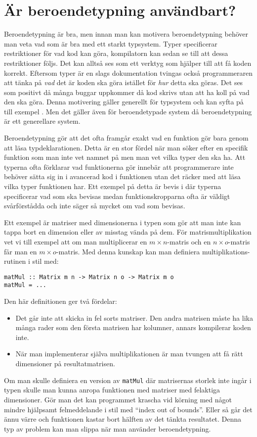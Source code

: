 \section{Är beroendetypning användbart?}
Beroendetypning är bra, men innan man kan motivera beroendetypning behöver man
veta vad som är bra med ett starkt typsystem.
Typer specificerar restriktioner för vad kod kan göra, kompilatorn kan sedan se
till att dessa restriktioner följs. Det kan alltså ses som ett verktyg som
hjälper till att få koden korrekt. Eftersom typer är en slags dokumentation
tvingas också programmeraren att tänka på
\emph{vad} det är koden ska göra istället för \emph{hur} detta ska göras. Det
ses som positivt då många buggar uppkommer då kod skrivs utan att ha koll på
vad den ska göra. Denna motivering gäller generellt för typsystem och kan syfta
på till exempel \haskell{}. Men det gäller även för beroendetypade system då
beroendetypning är ett generellare system.

Beroendetypning gör att det ofta framgår exakt vad en funktion gör bara genom
att läsa typdeklarationen. Detta är en stor fördel när man söker efter en
specifik funktion som man inte vet namnet på men man vet vilka typer den ska
ha. Att typerna ofta förklarar vad funktionerna gör innebär att programmerare
inte behöver sätta sig in i avancerad kod i funktionen utan det räcker med att
läsa vilka typer funktionen har. Ett exempel på detta är bevis i \coq{} där
typerna specificerar vad som ska bevisas medan funktionskropparna ofta är
väldigt svårförstådda och inte säger så mycket om vad som bevisas.

Ett exempel är matriser med dimensionerna i typen som gör att man inte kan
tappa bort en dimension eller av misstag vända på dem. För matrismultiplikation
vet vi till exempel att om man multiplicerar en $m \times n$-matris och en $n
\times o$-matris får man en $m \times o$-matris. Med denna kunskap kan man
definiera multiplikations-rutinen i stil med:

\begin{verbatim}
matMul :: Matrix m n -> Matrix n o -> Matrix m o
matMul = ...
\end{verbatim}

Den här definitionen ger två fördelar:

\begin{itemize}
  \item Det går inte att skicka in fel sorts matriser. Den andra matrisen måste
    ha lika många rader som den första matrisen har kolumner, annars kompilerar
    koden inte.
  \item När man implementerar själva multiplikationen är man tvungen att få rätt
    dimensioner på resultatmatrisen.
\end{itemize}

Om man skulle definiera en version av \verb+matMul+ där matrisernas storlek
inte ingår i typen skulle man kunna anropa funktionen med matriser med
felaktiga dimensioner. Gör man det kan programmet krascha vid körning med något
mindre hjälpsamt felmeddelande i stil med ``index out of bounds''. Eller så går
det ännu värre och funktionen kastar bort hälften av det tänkta resultatet.
Denna typ av problem kan man slippa när man använder beroendetypning.
